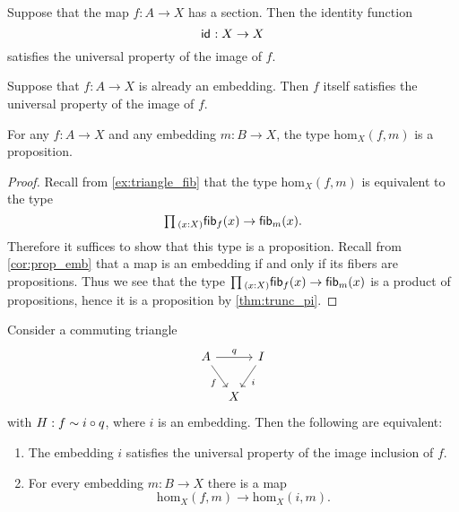 \begin{rmk}
  Suppose that the map $f:A\to X$ has a section. Then the identity function
  \begin{equation*}
    \mathsf{id}_{}:X\to X
  \end{equation*}
  satisfies the universal property of the image of $f$. 
\end{rmk}

\begin{rmk}
  Suppose that $f:A\to X$ is already an embedding. Then $f$ itself satisfies the universal property of the image of $f$.
\end{rmk}

\begin{lem}
For any $f:A\to X$ and any embedding $m:B\to X$, the type $\mathrm{hom}_X(f,m)$ is a proposition.
\end{lem}

\begin{proof}
  Recall from \cref{ex:triangle_fib} that the type $\mathrm{hom}_X(f,m)$ is equivalent to the type
  \begin{equation*}
    \prd{x:X}\fib{f}{x}\to\fib{m}{x}.
  \end{equation*}
  Therefore it suffices to show that this type is a proposition. Recall from \cref{cor:prop_emb} that a map is an embedding if and only if its fibers are propositions.
  Thus we see that the type $\prd{x:X}\fib{f}{x}\to\fib{m}{x}$ is a product of propositions, hence it is a proposition by \cref{thm:trunc_pi}.
\end{proof}

\begin{prp}\label{prp:simplifly-universal-property-image}
  Consider a commuting triangle
  \begin{equation*}
    \begin{tikzcd}[column sep=tiny]
      A \arrow[rr,"q"] \arrow[dr,swap,"f"] & & I \arrow[dl,"i"] \\
      & X
\end{tikzcd}
  \end{equation*}
  with $H:f\sim i\circ q$, where $i$ is an embedding. Then the following are equivalent:
  \begin{enumerate}
  \item The embedding $i$ satisfies the universal property of the image inclusion of $f$.
  \item For every embedding $m:B\to X$ there is a map
    \begin{equation*}
      \mathrm{hom}_X(f,m)\to\mathrm{hom}_X(i,m).
    \end{equation*}
  \end{enumerate}
\end{prp}

